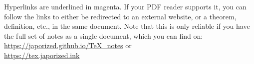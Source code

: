 \documentclass{tufte-handout}
\begin{document}
\noindent
Hyperlinks are underlined in \textcolor{be-magenta}{magenta}. If your PDF reader supports it,
you can follow the links to either be redirected to an external website, or a theorem, definition,
etc., in the same document. Note that this is only reliable if you have the full set of notes as a
single document, which you can find on: \\ 
\url{https://japorized.github.io/TeX_notes} or \\
\url{https://tex.japorized.ink}

\nobibliography*


\printindex
\end{document}

